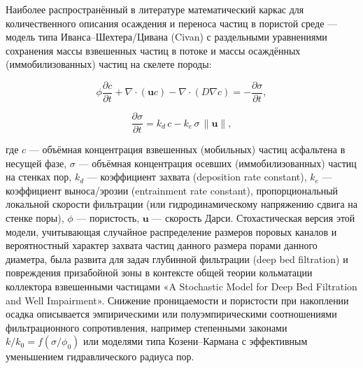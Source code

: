 \documentclass[11pt]{extarticle}
\begin{document}
Наиболее распространённый в литературе математический каркас для количественного описания осаждения и переноса частиц в пористой среде --- модель типа Иванса--Шехтера/Цивана (Civan) с раздельными уравнениями сохранения массы взвешенных частиц в потоке и массы осаждённых (иммобилизованных) частиц на скелете породы:

\[
\phi \frac{\partial c}{\partial t} + \nabla\cdot(\mathbf{u}c) - \nabla\cdot(D\nabla c) = -\frac{\partial \sigma}{\partial t},
\]

\[
\frac{\partial \sigma}{\partial t} = k_d\, c - k_e\, \sigma\, \|\mathbf{u}\|,
\]

где \(c\) --- объёмная концентрация взвешенных (мобильных) частиц асфальтена в несущей фазе, \(\sigma\) --- объёмная концентрация осевших (иммобилизованных) частиц на стенках пор, \(k_d\) --- коэффициент захвата (deposition rate constant), \(k_e\) --- коэффициент выноса/эрозии (entrainment rate constant), пропорциональный локальной скорости фильтрации (или гидродинамическому напряжению сдвига на стенке поры), \(\phi\) --- пористость, \(\mathbf{u}\) --- скорость Дарси. Стохастическая версия этой модели, учитывающая случайное распределение размеров поровых каналов и вероятностный характер захвата частиц данного размера порами данного диаметра, была развита для задач глубинной фильтрации (deep bed filtration) и повреждения призабойной зоны в контексте общей теории кольматации коллектора взвешенными частицами «A Stochastic Model for Deep Bed Filtration and Well Impairment». Снижение проницаемости и пористости при накоплении осадка описывается эмпирическими или полуэмпирическими соотношениями фильтрационного сопротивления, например степенными законами \(k/k_0 = f(\sigma/\phi_0)\) или моделями типа Козени--Кармана с эффективным уменьшением гидравлического радиуса пор.
\end{document}
